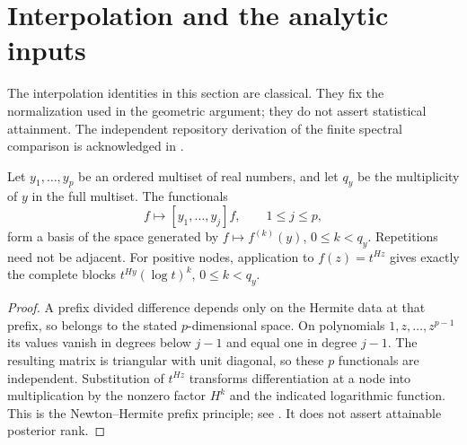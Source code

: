 \section{Interpolation and the analytic inputs}\label{sec:classical}
The interpolation identities in this section are classical. They fix the
normalization used in the geometric argument; they do not assert
statistical attainment. The independent repository derivation of the
finite spectral comparison is acknowledged in \cite{A1v9note}.

\begin{lemma}\label{lem:prefix-hermite}
Let $y_1,\ldots,y_p$ be an ordered multiset of real numbers, and let
$q_y$ be the multiplicity of $y$ in the full multiset. The functionals
\[
 f\longmapsto[y_1,\ldots,y_j]f,\qquad 1\le j\le p,
\]
form a basis of the space generated by
$f\mapsto f^{(k)}(y)$, $0\le k<q_y$. Repetitions need not be adjacent.
For positive nodes, application to $f(z)=t^{Hz}$ gives exactly the
complete blocks $t^{Hy}(\log t)^k$, $0\le k<q_y$.
\end{lemma}
\begin{proof}
A prefix divided difference depends only on the Hermite data at that
prefix, so belongs to the stated $p$-dimensional space. On polynomials
$1,z,\ldots,z^{p-1}$ its values vanish in degrees below $j-1$ and
equal one in degree $j-1$. The resulting matrix is triangular with
unit diagonal, so these $p$ functionals are independent. Substitution
of $t^{Hz}$ transforms differentiation at a node into multiplication
by the nonzero factor $H^k$ and the indicated logarithmic function.
This is the Newton--Hermite prefix principle; see
\cite[Proposition 7]{deBoor}. It does not assert attainable posterior rank.
\end{proof}


